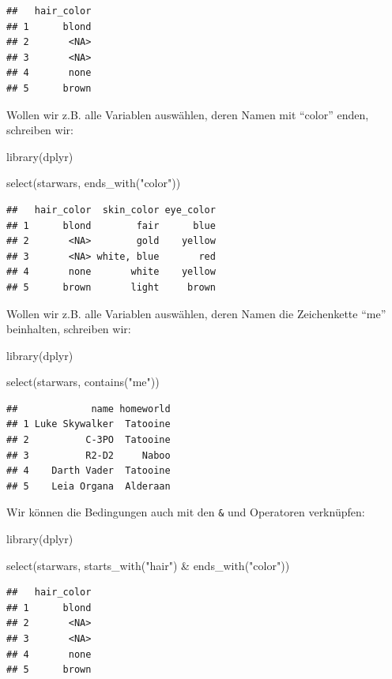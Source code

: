\documentclass[
]{book}
\newenvironment{Shaded}{\begin{snugshade}}{\end{snugshade}}
\newcommand{\FunctionTok}[1]{\textcolor[rgb]{0.00,0.00,0.00}{#1}}
\newcommand{\NormalTok}[1]{#1}
\newcommand{\SpecialCharTok}[1]{\textcolor[rgb]{0.00,0.00,0.00}{#1}}
\newcommand{\StringTok}[1]{\textcolor[rgb]{0.31,0.60,0.02}{#1}}
\begin{document}
\begin{verbatim}
##   hair_color
## 1      blond
## 2       <NA>
## 3       <NA>
## 4       none
## 5      brown
\end{verbatim}

Wollen wir z.B. alle Variablen auswählen, deren Namen mit ``color'' enden, schreiben wir:

\begin{Shaded}
\begin{Highlighting}[]
\FunctionTok{library}\NormalTok{(dplyr)}

\FunctionTok{select}\NormalTok{(starwars, }\FunctionTok{ends\_with}\NormalTok{(}\StringTok{"color"}\NormalTok{))}
\end{Highlighting}
\end{Shaded}

\begin{verbatim}
##   hair_color  skin_color eye_color
## 1      blond        fair      blue
## 2       <NA>        gold    yellow
## 3       <NA> white, blue       red
## 4       none       white    yellow
## 5      brown       light     brown
\end{verbatim}

Wollen wir z.B. alle Variablen auswählen, deren Namen die Zeichenkette ``me'' beinhalten, schreiben wir:

\begin{Shaded}
\begin{Highlighting}[]
\FunctionTok{library}\NormalTok{(dplyr)}

\FunctionTok{select}\NormalTok{(starwars, }\FunctionTok{contains}\NormalTok{(}\StringTok{"me"}\NormalTok{))}
\end{Highlighting}
\end{Shaded}

\begin{verbatim}
##             name homeworld
## 1 Luke Skywalker  Tatooine
## 2          C-3PO  Tatooine
## 3          R2-D2     Naboo
## 4    Darth Vader  Tatooine
## 5    Leia Organa  Alderaan
\end{verbatim}

Wir können die Bedingungen auch mit den \texttt{\&} und \texttt{\textbar{}} Operatoren verknüpfen:

\begin{Shaded}
\begin{Highlighting}[]
\FunctionTok{library}\NormalTok{(dplyr)}

\FunctionTok{select}\NormalTok{(starwars, }\FunctionTok{starts\_with}\NormalTok{(}\StringTok{"hair"}\NormalTok{) }\SpecialCharTok{\&} \FunctionTok{ends\_with}\NormalTok{(}\StringTok{"color"}\NormalTok{))}
\end{Highlighting}
\end{Shaded}

\begin{verbatim}
##   hair_color
## 1      blond
## 2       <NA>
## 3       <NA>
## 4       none
## 5      brown
\end{verbatim}

  
\end{document}
